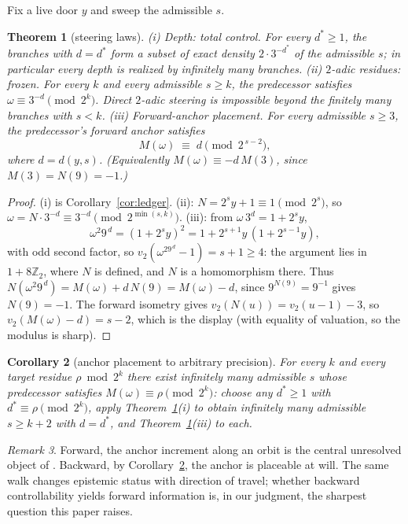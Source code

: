\documentclass[11pt]{article}
\newtheorem{theorem}{Theorem}[section]
\newtheorem{corollary}[theorem]{Corollary}
\theoremstyle{remark}
\newtheorem{remark}[theorem]{Remark}
\newcommand{\Z}{\mathbb{Z}}
\newcommand{\vt}[1]{v_2\!\left(#1\right)}
\newcommand{\w}{\omega}
\begin{document}
Fix a live door $y$ and sweep the admissible $s$.

\begin{theorem}[steering laws]\label{thm:steer}
(i) \emph{Depth: total control.} For every $d^* \ge 1$, the branches with $d = d^*$ form a subset of exact density $2\cdot3^{-d^*}$ of the admissible $s$; in particular every depth is realized by infinitely many branches.
(ii) \emph{$2$-adic residues: frozen.} For every $k$ and every admissible $s \ge k$, the predecessor satisfies $\w \equiv 3^{-d} \pmod{2^{k}}$. Direct $2$-adic steering is impossible beyond the finitely many branches with $s < k$.
(iii) \emph{Forward-anchor placement.} For every admissible $s \ge 3$, the predecessor's forward anchor satisfies
\[ M(\w) \;\equiv\; d \pmod{2^{\,s-2}}, \]
where $d = d(y,s)$. (Equivalently $M(\w) \equiv -d\,M(3)$, since $M(3) = N(9) = -1$.)
\end{theorem}

\begin{proof}
(i) is Corollary~\ref{cor:ledger}. (ii): $N = 2^s y + 1 \equiv 1 \pmod{2^s}$, so $\w = N\cdot3^{-d} \equiv 3^{-d} \pmod{2^{\min(s,k)}}$. (iii): from $\w\,3^d = 1 + 2^s y$,
\[ \w^2 9^{\,d} = (1 + 2^s y)^2 = 1 + 2^{s+1}y\,(1 + 2^{s-1}y), \]
with odd second factor, so $\vt{\w^29^{\,d} - 1} = s + 1 \ge 4$: the argument lies in $1 + 8\Z_2$, where $N$ is defined, and $N$ is a homomorphism there. Thus $N(\w^2 9^{\,d}) = M(\w) + d\,N(9) = M(\w) - d$, since $9^{N(9)} = 9^{-1}$ gives $N(9) = -1$. The forward isometry gives $\vt{N(u)} = \vt{u - 1} - 3$, so $\vt{M(\w) - d} = s - 2$, which is the display (with equality of valuation, so the modulus is sharp).
\end{proof}

\begin{corollary}[anchor placement to arbitrary precision]\label{cor:place}
For every $k$ and every target residue $\rho \bmod 2^k$ there exist infinitely many admissible $s$ whose predecessor satisfies $M(\w) \equiv \rho \pmod{2^k}$: choose any $d^* \ge 1$ with $d^* \equiv \rho \pmod{2^k}$, apply Theorem~\ref{thm:steer}(i) to obtain infinitely many admissible $s \ge k + 2$ with $d = d^*$, and Theorem~\ref{thm:steer}(iii) to each.
\end{corollary}

\begin{remark}
Forward, the anchor increment along an orbit is the central unresolved object of \cite{paper1}. Backward, by Corollary~\ref{cor:place}, the anchor is placeable at will. The same walk changes epistemic status with direction of travel; whether backward controllability yields forward information is, in our judgment, the sharpest question this paper raises.
\end{remark}
\end{document}
